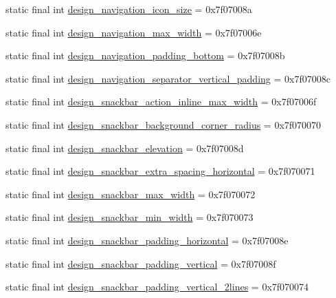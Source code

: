 \begin{CompactItemize}
\item 
static final int \hyperlink{classandroid_1_1support_1_1v4_1_1_r_1_1dimen_a7a45ec590cfb6b23f3617c36de77dbb}{design\_\-navigation\_\-icon\_\-size} = 0x7f07008a
\item 
static final int \hyperlink{classandroid_1_1support_1_1v4_1_1_r_1_1dimen_717208b37d5efa7b194b4df65eeb09ba}{design\_\-navigation\_\-max\_\-width} = 0x7f07006e
\item 
static final int \hyperlink{classandroid_1_1support_1_1v4_1_1_r_1_1dimen_27a3808f7966677c677273637d176a61}{design\_\-navigation\_\-padding\_\-bottom} = 0x7f07008b
\item 
static final int \hyperlink{classandroid_1_1support_1_1v4_1_1_r_1_1dimen_e98b6c29d7e28c58d11c1223d08ff45e}{design\_\-navigation\_\-separator\_\-vertical\_\-padding} = 0x7f07008c
\item 
static final int \hyperlink{classandroid_1_1support_1_1v4_1_1_r_1_1dimen_a05179fc0da852f323ebc06cd60604e1}{design\_\-snackbar\_\-action\_\-inline\_\-max\_\-width} = 0x7f07006f
\item 
static final int \hyperlink{classandroid_1_1support_1_1v4_1_1_r_1_1dimen_edd77cf0b7fe88d6ec11072e46b62b6a}{design\_\-snackbar\_\-background\_\-corner\_\-radius} = 0x7f070070
\item 
static final int \hyperlink{classandroid_1_1support_1_1v4_1_1_r_1_1dimen_4ad984017f9392b40681953f4501590c}{design\_\-snackbar\_\-elevation} = 0x7f07008d
\item 
static final int \hyperlink{classandroid_1_1support_1_1v4_1_1_r_1_1dimen_f4606983868d04a61d0cd4548aef3552}{design\_\-snackbar\_\-extra\_\-spacing\_\-horizontal} = 0x7f070071
\item 
static final int \hyperlink{classandroid_1_1support_1_1v4_1_1_r_1_1dimen_2bac29313a980f438ee07bf9dc4bf919}{design\_\-snackbar\_\-max\_\-width} = 0x7f070072
\item 
static final int \hyperlink{classandroid_1_1support_1_1v4_1_1_r_1_1dimen_f052a0da45a1be0f125c25f539c2899e}{design\_\-snackbar\_\-min\_\-width} = 0x7f070073
\item 
static final int \hyperlink{classandroid_1_1support_1_1v4_1_1_r_1_1dimen_43d5bd42f01e37b2b9cc065555c88c68}{design\_\-snackbar\_\-padding\_\-horizontal} = 0x7f07008e
\item 
static final int \hyperlink{classandroid_1_1support_1_1v4_1_1_r_1_1dimen_851856c4484bb1234f639d0f2701e8ee}{design\_\-snackbar\_\-padding\_\-vertical} = 0x7f07008f
\item 
static final int \hyperlink{classandroid_1_1support_1_1v4_1_1_r_1_1dimen_5e9fe689ffdb44ec7d2fab8c6fea7ddd}{design\_\-snackbar\_\-padding\_\-vertical\_\-2lines} = 0x7f070074

\end{CompactItemize}
